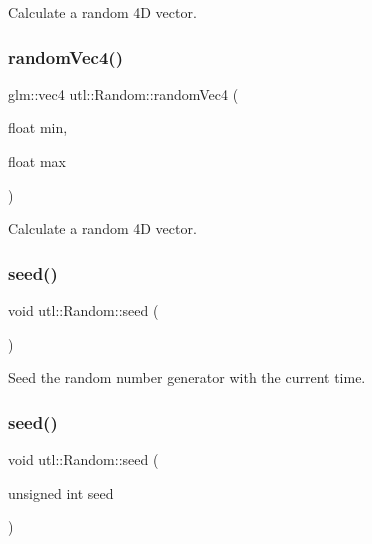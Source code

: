 Calculate a random 4D vector. \mbox{\label{classutl_1_1_random_a38f60c4bd2fca40f4392672d3876b17a}} 
\subsubsection{\texorpdfstring{random\+Vec4()}{randomVec4()}\hspace{0.1cm}{\footnotesize\ttfamily [2/2]}}
{\footnotesize\ttfamily glm\+::vec4 utl\+::\+Random\+::random\+Vec4 (\begin{DoxyParamCaption}\item[{float}]{min,  }\item[{float}]{max }\end{DoxyParamCaption})\hspace{0.3cm}{\ttfamily [static]}}

Calculate a random 4D vector. \mbox{\label{classutl_1_1_random_a49284e0d91bf8f039b03d811e848821f}} 
\subsubsection{\texorpdfstring{seed()}{seed()}\hspace{0.1cm}{\footnotesize\ttfamily [1/2]}}
{\footnotesize\ttfamily void utl\+::\+Random\+::seed (\begin{DoxyParamCaption}{ }\end{DoxyParamCaption})\hspace{0.3cm}{\ttfamily [static]}}

Seed the random number generator with the current time. \mbox{\label{classutl_1_1_random_ac91fc644c7437c700f2c1addeb65125a}} 
\subsubsection{\texorpdfstring{seed()}{seed()}\hspace{0.1cm}{\footnotesize\ttfamily [2/2]}}
{\footnotesize\ttfamily void utl\+::\+Random\+::seed (\begin{DoxyParamCaption}\item[{unsigned int}]{seed }\end{DoxyParamCaption})\hspace{0.3cm}{\ttfamily [static]}}

